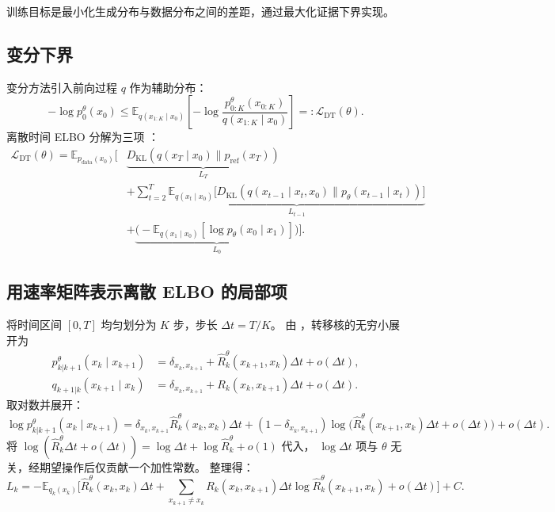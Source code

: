 \documentclass[12pt,a4paper]{ctexbook}
\theoremstyle{definition}
\begin{document}
训练目标是最小化生成分布与数据分布之间的差距，通过最大化证据下界实现。

\subsection{变分下界}

变分方法引入前向过程 $q$ 作为辅助分布：
\begin{equation}
-\log p_0^\theta(x_0) \leq \mathbb{E}_{q(x_{1:K} \mid x_0)}\left[-\log \frac{p_{0:K}^\theta(x_{0:K})}{q(x_{1:K} \mid x_0)}\right] =: \mathcal{L}_{\text{DT}}(\theta). \label{eq:elbo-basic}
\end{equation}
离散时间 ELBO 分解为三项 \cite[§2]{austin2021d3pm}：
\begin{equation}
\begin{aligned}
\mathcal{L}_{\text{DT}}(\theta) = \mathbb{E}_{p_{\text{data}}(x_0)}\Big[
&\underbrace{D_{\text{KL}}(q(x_T \mid x_0) \parallel p_{\text{ref}}(x_T))}_{L_T} \\
&+ \sum_{t=2}^T \underbrace{\mathbb{E}_{q(x_t \mid x_0)}\big[D_{\text{KL}}(q(x_{t-1} \mid x_t, x_0) \parallel p_\theta(x_{t-1} \mid x_t))\big]}_{L_{t-1}} \\
&+ \underbrace{\big(-\mathbb{E}_{q(x_1 \mid x_0)}[\log p_\theta(x_0 \mid x_1)]\big)}_{L_0}
\Big]. \label{eq:elbo-discrete}
\end{aligned}
\end{equation}

\subsection{用速率矩阵表示离散 ELBO 的局部项}

将时间区间 $[0, T]$ 均匀划分为 $K$ 步，步长 $\Delta t = T/K$。
由 \cite[Appendix B.2]{campbell2022ctmc}，转移核的无穷小展开为
\begin{align}
p_{k|k+1}^\theta(x_k \mid x_{k+1}) &= \delta_{x_k, x_{k+1}} + \hat{R}_k^\theta(x_{k+1}, x_k) \Delta t + o(\Delta t), \label{eq:p-expand} \\
q_{k+1|k}(x_{k+1} \mid x_k) &= \delta_{x_k, x_{k+1}} + R_k(x_k, x_{k+1}) \Delta t + o(\Delta t). \label{eq:q-expand}
\end{align}
取对数并展开：
\begin{equation}
\log p_{k|k+1}^\theta(x_k \mid x_{k+1}) = \delta_{x_k, x_{k+1}} \hat{R}_k^\theta(x_k, x_k) \Delta t + (1 - \delta_{x_k, x_{k+1}}) \log\big(\hat{R}_k^\theta(x_{k+1}, x_k) \Delta t + o(\Delta t)\big) + o(\Delta t). \label{eq:log-p-expand}
\end{equation}
将 $\log(\hat{R}_k^\theta \Delta t + o(\Delta t)) = \log \Delta t + \log \hat{R}_k^\theta + o(1)$ 代入，
$\log \Delta t$ 项与 $\theta$ 无关，经期望操作后仅贡献一个加性常数。
整理得：
\begin{equation}
L_k = -\mathbb{E}_{q_k(x_k)}\Big[ \hat{R}_k^\theta(x_k, x_k) \Delta t + \sum_{x_{k+1} \neq x_k} R_k(x_k, x_{k+1}) \Delta t \log \hat{R}_k^\theta(x_{k+1}, x_k) + o(\Delta t) \Big] + C. \label{eq:l-k}
\end{equation}
\end{document}
